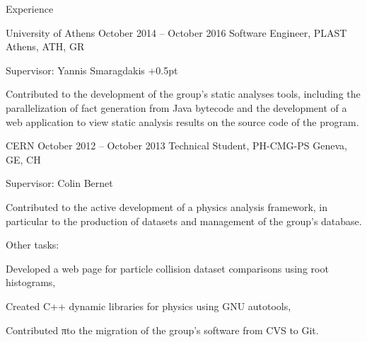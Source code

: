 \documentclass{resume}
\begin{document}
\begin{rSection}{Experience}

\begin{rSubsection}
  {University of Athens}
  {October 2014 -- October 2016}
  {Software Engineer, PLAST}
  {Athens, ATH, GR}
\item Supervisor: Yannis Smaragdakis
  \itemsep +0.5pt %
\item Contributed to the development of the group's static analyses tools, including the
  parallelization of fact generation from Java bytecode and the development
  of a web application to view static analysis results on the source code of the program.
\end{rSubsection}


\begin{rSubsection}
  {CERN}
  {October 2012 -- October 2013}
  {Technical Student, PH-CMG-PS}
  {Geneva, GE, CH}
\item Supervisor: Colin Bernet
  \item Contributed to the active development of a physics analysis framework,
  in particular to the production of datasets and management of the
  group's database.
\item Other tasks: \\
  \begin{inparaenum}[(i)]
  \item Developed a web page for particle collision dataset comparisons using root histograms, \\
  \item Created C++ dynamic libraries for physics using GNU autotools, \\
  \item Contributed πto the migration of the group's software from CVS to Git.
  \end{inparaenum}
\end{rSubsection}

\end{rSection}

\pagebreak
\end{document}

